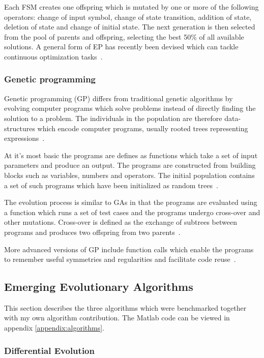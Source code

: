 Each FSM creates one offspring which is mutated by one or more of the following operators: change of input symbol, change of state transition, addition of state, deletion of state and change of initial state. The next generation is then selected from the pool of parents and offspring, selecting the best 50\% of all available solutions. A general form of EP has recently been devised which can tackle continuous optimization tasks~\cite{Michalewicz1997}.

\subsubsection{Genetic programming}

Genetic programming (GP) differs from traditional genetic algorithms by evolving computer programs which solve problems instead of directly finding the solution to a problem. The individuals in the population are therefore data-structures which encode computer programs, usually rooted trees representing expressions~\cite{Michalewicz1997}.

At it's most basic the programs are defines as functions which take a set of input parameters and produce an output. The programs are constructed from building blocks such as variables, numbers and operators. The initial population contains a set of such programs which have been initialized as random trees~\cite{Michalewicz1997}.

The evolution process is similar to GAs in that the programs are evaluated using a function which runs a set of test cases and the programs undergo cross-over and other mutations. Cross-over is defined as the exchange of subtrees between programs and produces two offspring from two parents~\cite{Michalewicz1997}.

More advanced versions of GP include function calls which enable the programs to remember useful symmetries and regularities and facilitate code reuse~\cite{Michalewicz1997}.

\subsection{Emerging Evolutionary Algorithms}

This section describes the three algorithms which were benchmarked together with my own algorithm contribution. The Matlab code can be viewed in appendix \ref{appendix:algorithms}.

\subsubsection{Differential Evolution}

